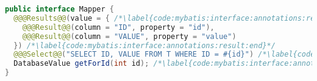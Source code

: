 
\begin{lstlisting}[language=Java, caption={Definition of Mapper interface using annotations}, label={code:mybatis:interface:annotations}]
public interface Mapper {
  @@@Results@@(value = { /*\label{code:mybatis:interface:annotations:result:begin}*/
    @@@Result@@(column = "ID", property = "id"),
    @@@Result@@(column = "VALUE", property = "value")
  }) /*\label{code:mybatis:interface:annotations:result:end}*/
  @@@Select@@("SELECT ID, VALUE FROM T WHERE ID = #{id}") /*\label{code:mybatis:interface:annotations:query}*/
  DatabaseValue getForId(int id); /*\label{code:mybatis:interface:annotations:method}*/
}
\end{lstlisting}
